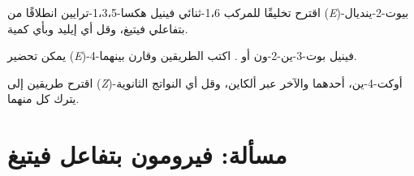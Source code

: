 \begin{exercise}[$\star\star\star$]\label{exo:b2:wittig:10}
اقترح تخليقًا للمركب 1،6-ثنائي فينيل هكسا-1،3،5-ترايين انطلاقًا من (\textit{E})-بيوت-2-ينديال
 بتفاعلي فيتيغ، وقل أي إيليد وبأي كمية.
\end{exercise}

\begin{exercise}[$\star\star\star$]\label{exo:b2:wittig:11}
يمكن تحضير (\textit{E})-4-فينيل بوت-3-ين-2-ون  أو .
اكتب الطريقين وقارن بينهما.
\end{exercise}

\begin{exercise}[$\star\star\star$]\label{exo:b2:wittig:12}
اقترح طريقين إلى (\textit{Z})-أوكت-4-ين، أحدهما  والآخر عبر ألكاين،
وقل أي النواتج الثانوية يترك كل منهما.
\end{exercise}

\section{مسألة: فيرومون بتفاعل فيتيغ}


